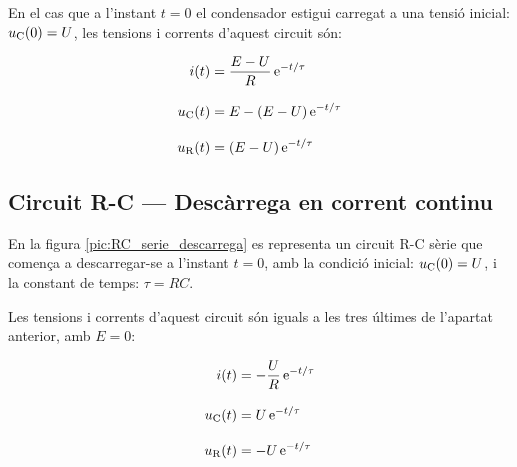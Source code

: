 \vspace{5mm}
En el cas que a l'instant $t=0$ el condensador  estigui carregat a una tensió inicial: $u_\mathrm{C}(0) = U$, les tensions i corrents d'aquest circuit són:

\hfill
\begin{minipage}[b]{9cm}
    
\end{minipage}
\hfill
\begin{minipage}[b]{6cm}
    \begin{align}
        i(t) &= \frac{E-U}{R}\,\mathrm{e}^{-t/\tau} \\[3mm]
        u_\mathrm{C}(t) &= E  - (E-U) \,\mathrm{e}^{-t/\tau}  \\[3mm]
        u_\mathrm{R}(t) &= (E-U)\,\mathrm{e}^{-t/\tau}
    \end{align}
\end{minipage}


\subsection{Circuit R-C --- Descàrrega en corrent continu}\label{sec:RC-descarrega}

En la figura \vref{pic:RC_serie_descarrega} es representa un circuit R-C sèrie que comença a descarregar-se a l'instant $t=0$, amb la condició inicial: $u_\mathrm{C}(0) = U$, i la constant de temps: $\tau = R C$.
\begin{center}
    
    \label{pic:RC_serie_descarrega}
\end{center}

Les tensions i corrents d'aquest circuit són iguals a les tres últimes de l'apartat anterior, amb $E=0$:

\hfill
\begin{minipage}[b]{9cm}
    
\end{minipage}
\hfill
\begin{minipage}[b]{6cm}
    \begin{align}
        i(t) &= - \frac{U}{R}\,\mathrm{e}^{-t/\tau} \\[3mm]
        u_\mathrm{C}(t) &= U\,\mathrm{e}^{-t/\tau} \\[3mm]
        u_\mathrm{R}(t) &= - U\,\mathrm{e}^{-t/\tau}
    \end{align}
\end{minipage}


